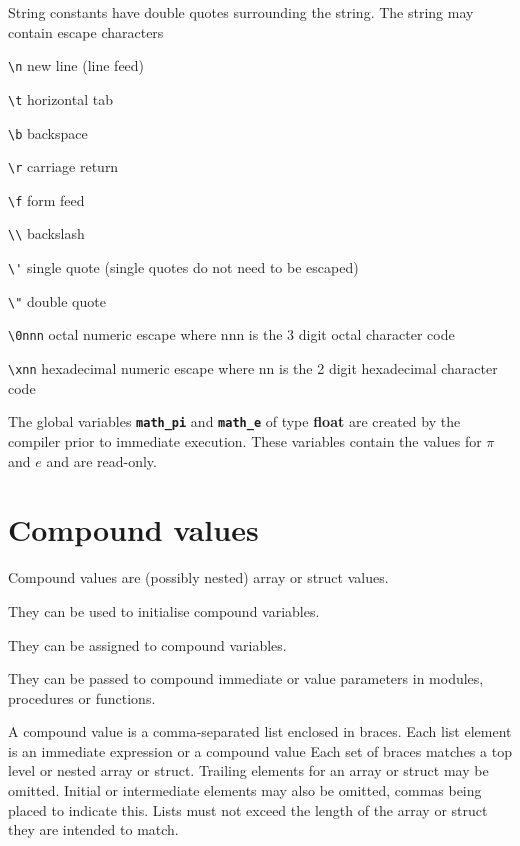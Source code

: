         String constants have double quotes surrounding the string. The string
        may contain escape characters
        \blist
	\item   \verb'\n' new line (line feed)
        \item   \verb'\t' horizontal tab
        \item   \verb'\b' backspace
        \item   \verb'\r' carriage return
        \item   \verb'\f' form feed
        \item   \verb'\\' backslash
	\item   \verb+\'+ single quote (single quotes do not need to be escaped)
        \item   \verb'\"' double quote
        \item   \verb'\0nnn' octal numeric escape where nnn is the 3 digit octal
                character code
        \item   \verb'\xnn' hexadecimal numeric escape where nn is the 2 digit
                hexadecimal character code
        \blend
        
        The global variables {\bf \verb'math_pi'} and {\bf \verb'math_e'}
        of type {\bf float} are created by the compiler prior to immediate
        execution. These variables contain the values for $\pi$ and $e$ and
        are read-only.

    \section{Compound values}

        Compound values are (possibly nested) array or struct values.
        \blist
        \item   They can be used to initialise compound variables.
        \item   They can be assigned to compound variables.
        \item   They can be passed to compound immediate or value
                parameters in modules, procedures or functions.
        \blend

        A compound value is a comma-separated list enclosed in braces. Each list
        element is an immediate expression or a compound value Each set of braces
        matches a top level or nested array or struct. Trailing elements for an
        array or struct may be omitted. Initial or intermediate elements may also
        be omitted, commas being placed to indicate this. Lists must not exceed the
        length of the array or struct they are intended to match.
        
